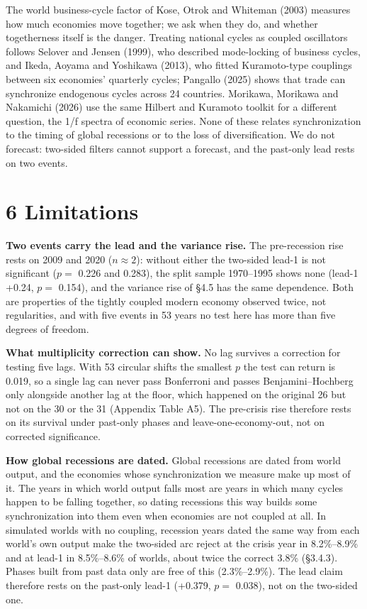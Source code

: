 \documentclass[11pt,a4paper]{article}
\newcounter{none}                    %
\begin{document}
The world business-cycle factor of Kose, Otrok and Whiteman (2003) measures how much economies move together; we ask when they do, and whether togetherness itself is the danger. Treating national cycles as coupled oscillators follows Selover and Jensen (1999), who described mode-locking of business cycles, and Ikeda, Aoyama and Yoshikawa (2013), who fitted Kuramoto-type couplings between six economies' quarterly cycles; Pangallo (2025) shows that trade can synchronize endogenous cycles across 24 countries. Morikawa, Morikawa and Nakamichi (2026) use the same Hilbert and Kuramoto toolkit for a different question, the 1/f spectra of economic series. None of these relates synchronization to the timing of global recessions or to the loss of diversification. We do not forecast: two-sided filters cannot support a forecast, and the past-only lead rests on two events.

\section{6 Limitations}\label{limitations}

\textbf{Two events carry the lead and the variance rise.} The pre-recession rise rests on 2009 and 2020 (\(n \approx 2\)): without either the two-sided lead-1 is not significant (\(p =\) 0.226 and 0.283), the split sample 1970–1995 shows none (lead-1 +0.24, \(p =\) 0.154), and the variance rise of §4.5 has the same dependence. Both are properties of the tightly coupled modern economy observed twice, not regularities, and with five events in 53 years no test here has more than five degrees of freedom.

\textbf{What multiplicity correction can show.} No lag survives a correction for testing five lags. With 53 circular shifts the smallest \(p\) the test can return is 0.019, so a single lag can never pass Bonferroni and passes Benjamini–Hochberg only alongside another lag at the floor, which happened on the original 26 but not on the 30 or the 31 (Appendix Table A5). The pre-crisis rise therefore rests on its survival under past-only phases and leave-one-economy-out, not on corrected significance.

\textbf{How global recessions are dated.} Global recessions are dated from world output, and the economies whose synchronization we measure make up most of it. The years in which world output falls most are years in which many cycles happen to be falling together, so dating recessions this way builds some synchronization into them even when economies are not coupled at all. In simulated worlds with no coupling, recession years dated the same way from each world's own output make the two-sided arc reject at the crisis year in 8.2\%–8.9\% and at lead-1 in 8.5\%–8.6\% of worlds, about twice the correct 3.8\% (§3.4.3). Phases built from past data only are free of this (2.3\%–2.9\%). The lead claim therefore rests on the past-only lead-1 (+0.379, \(p =\) 0.038), not on the two-sided one.
\end{document}
